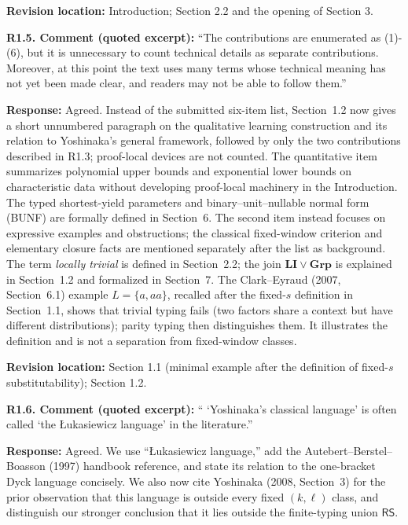 \documentclass[
  10pt,
  a4paper,
]{article}
\begin{document}
\textbf{Revision location:} Introduction; Section 2.2 and the opening of Section 3.


\textbf{R1.5. Comment (quoted excerpt):} ``The contributions are enumerated as
(1)-(6), but it is unnecessary to count technical details as separate
contributions. Moreover, at this point the text uses many terms whose
technical meaning has not yet been made clear, and readers may not be
able to follow them.''

\textbf{Response:} Agreed. Instead of the submitted six-item list,
Section~1.2 now gives a short unnumbered paragraph on the qualitative
learning construction and its relation to Yoshinaka's general framework,
followed by only the two contributions described in R1.3; proof-local
devices are not counted. The quantitative item summarizes polynomial
upper bounds and exponential lower bounds on characteristic data
without developing proof-local machinery in the Introduction.
The typed shortest-yield parameters and binary--unit--nullable
normal form (BUNF) are formally defined in Section~6. The
second item instead focuses on expressive examples and obstructions;
the classical fixed-window criterion and elementary closure
facts are mentioned separately after the list as background.
The term \emph{locally trivial} is defined in Section~2.2;
the join $\mathbf{LI}\vee\mathbf{Grp}$ is explained in
Section~1.2 and formalized in Section~7.
The Clark--Eyraud (2007, Section~6.1) example
$L=\{a,aa\}$, recalled after the fixed-$s$ definition in
Section~1.1, shows that trivial typing fails (two factors share a
context but have different distributions); parity typing then
distinguishes them. It illustrates the definition and is not a
separation from fixed-window classes.

\textbf{Revision location:} Section 1.1 (minimal example after the
definition of fixed-$s$ substitutability); Section 1.2.


\textbf{R1.6. Comment (quoted excerpt):} `` `Yoshinaka's classical language'
is often called `the Łukasiewicz language' in the literature.''

\textbf{Response:} Agreed. We use ``Łukasiewicz language,'' add the
Autebert--Berstel--Boasson (1997) handbook reference, and
state its relation to the one-bracket Dyck language concisely.  We also now
cite Yoshinaka (2008, Section~3) for the prior observation that this language
is outside every fixed $(k,\ell)$ class, and distinguish our stronger
conclusion that it lies outside the finite-typing union $\mathsf{RS}$.
\end{document}
